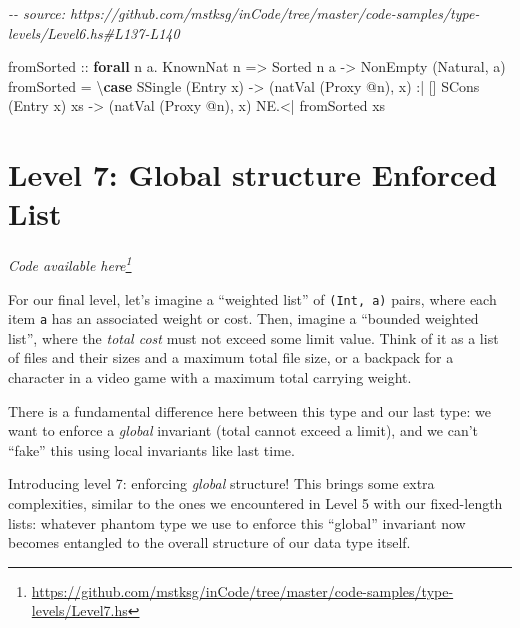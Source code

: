 \documentclass[]{article}
\newenvironment{Shaded}{}{}
\newcommand{\CommentTok}[1]{\textcolor[rgb]{0.38,0.63,0.69}{\textit{#1}}}
\newcommand{\DataTypeTok}[1]{\textcolor[rgb]{0.56,0.13,0.00}{#1}}
\newcommand{\KeywordTok}[1]{\textcolor[rgb]{0.00,0.44,0.13}{\textbf{#1}}}
\newcommand{\NormalTok}[1]{#1}
\newcommand{\OperatorTok}[1]{\textcolor[rgb]{0.40,0.40,0.40}{#1}}
\newcommand{\OtherTok}[1]{\textcolor[rgb]{0.00,0.44,0.13}{#1}}
\renewcommand{\href}[2]{#2\footnote{\url{#1}}}
\begin{document}
\begin{Shaded}
\begin{Highlighting}[]
\CommentTok{{-}{-} source: https://github.com/mstksg/inCode/tree/master/code{-}samples/type{-}levels/Level6.hs\#L137{-}L140}

\OtherTok{fromSorted ::} \KeywordTok{forall}\NormalTok{ n a}\OperatorTok{.} \DataTypeTok{KnownNat}\NormalTok{ n }\OtherTok{=\textgreater{}} \DataTypeTok{Sorted}\NormalTok{ n a }\OtherTok{{-}\textgreater{}} \DataTypeTok{NonEmpty}\NormalTok{ (}\DataTypeTok{Natural}\NormalTok{, a)}
\NormalTok{fromSorted }\OtherTok{=}\NormalTok{ \textbackslash{}}\KeywordTok{case}
  \DataTypeTok{SSingle}\NormalTok{ (}\DataTypeTok{Entry}\NormalTok{ x) }\OtherTok{{-}\textgreater{}}\NormalTok{ (natVal (}\DataTypeTok{Proxy} \OperatorTok{@}\NormalTok{n), x) }\OperatorTok{:|}\NormalTok{ []}
  \DataTypeTok{SCons}\NormalTok{ (}\DataTypeTok{Entry}\NormalTok{ x) xs }\OtherTok{{-}\textgreater{}}\NormalTok{ (natVal (}\DataTypeTok{Proxy} \OperatorTok{@}\NormalTok{n), x) }\OperatorTok{NE.\textless{}|}\NormalTok{ fromSorted xs}
\end{Highlighting}
\end{Shaded}

\section{Level 7: Global structure Enforced
List}\label{level-7-global-structure-enforced-list}

\emph{\href{https://github.com/mstksg/inCode/tree/master/code-samples/type-levels/Level7.hs}{Code
available here}}

For our final level, let's imagine a ``weighted list'' of \texttt{(Int,\ a)}
pairs, where each item \texttt{a} has an associated weight or cost. Then,
imagine a ``bounded weighted list'', where the \emph{total cost} must not exceed
some limit value. Think of it as a list of files and their sizes and a maximum
total file size, or a backpack for a character in a video game with a maximum
total carrying weight.

There is a fundamental difference here between this type and our last type: we
want to enforce a \emph{global} invariant (total cannot exceed a limit), and we
can't ``fake'' this using local invariants like last time.

Introducing level 7: enforcing \emph{global} structure! This brings some extra
complexities, similar to the ones we encountered in Level 5 with our
fixed-length lists: whatever phantom type we use to enforce this ``global''
invariant now becomes entangled to the overall structure of our data type
itself.
\end{document}
